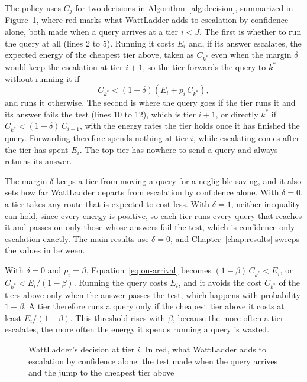 \documentclass[cic,dipl,english]{infufrgs}
\begin{document}
The policy uses $C_j$ for two decisions in Algorithm~\ref{alg:decision}, summarized in
Figure~\ref{fig:decision}, where red marks what WattLadder adds to escalation by confidence
alone, both made when a
query arrives at a tier $i < J$. The first is whether to run the query at all (lines 2
to 5). Running it costs $E_i$ and, if its answer escalates, the expected energy of the
cheapest tier above, taken as $C_{k^*}$ even when the margin $\delta$ would keep the escalation
at tier $i+1$, so the tier forwards the query to $k^*$ without running it if
\begin{equation}
  C_{k^*} < (1-\delta)\left(E_i + p_i \, C_{k^*}\right),
  \label{eq:on-arrival}
\end{equation}
and runs it otherwise. The second is where the query goes if the tier runs it and its
answer fails the test (lines 10 to 12), which is tier $i+1$, or directly $k^*$ if
$C_{k^*} < (1-\delta)\,C_{i+1}$, with the energy rates the tier holds once it has finished the
query. Forwarding therefore spends nothing at tier $i$, while
escalating comes after the tier has spent $E_i$. The top tier has nowhere to send a query and
always returns its answer.

The margin $\delta$ keeps a tier from moving a query for a negligible saving, and it also
sets how far WattLadder departs from escalation by confidence alone. With $\delta = 0$, a
tier takes any route that is expected to cost less. With $\delta = 1$, neither
inequality can hold, since every energy is positive, so each tier runs every query that
reaches it and passes on only those whose answers fail the test, which is confidence-only
escalation exactly. The main results use $\delta = 0$, and Chapter~\ref{chap:results}
sweeps the values in between.

With $\delta = 0$ and $p_i = \beta$, Equation~\eqref{eq:on-arrival} becomes
$(1-\beta)\,C_{k^*} < E_i$, or $C_{k^*} < E_i / (1-\beta)$. Running the query costs
$E_i$, and it avoids the cost $C_{k^*}$ of the tiers above only when the answer passes
the test, which happens with probability $1-\beta$. A tier therefore runs a query only
if the cheapest tier above it costs at least $E_i/(1-\beta)$. This threshold rises with
$\beta$, because the more often a tier escalates, the more often the energy it spends
running a query is wasted.

\begin{figure}[htb]
  \centering
  \caption[WattLadder's decision at tier $i$]{WattLadder's decision at tier $i$.
  In red, what WattLadder adds to escalation by confidence alone: the test made when the query arrives and the jump to the cheapest tier above}
  \label{fig:decision}
  \vspace{6pt}
  
  \vspace{4pt}
\end{figure}
\end{document}
